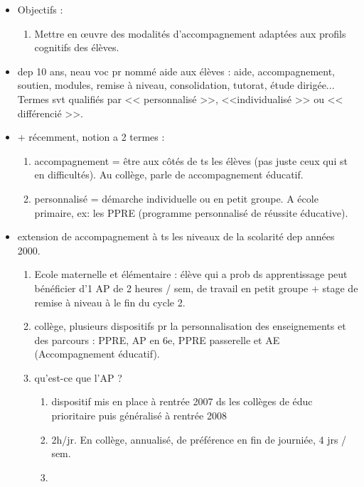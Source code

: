 \documentclass[12pt]{article}
\begin{document}
\begin{itemize}
\item Objectifs : 
\begin{enumerate}
\item Mettre en œuvre des modalités d'accompagnement adaptées aux profils cognitifs des élèves. \\
\end{enumerate}

\item dep 10 ans, neau voc pr nommé aide aux élèves : aide, accompagnement, soutien, modules, remise à niveau, consolidation, tutorat, étude dirigée... Termes svt qualifiés par << personnalisé >>, <<individualisé >> ou << différencié >>.\\
\item + récemment, notion a 2 termes : 
\begin{enumerate}
 \item accompagnement = être aux côtés de ts les élèves (pas juste ceux qui st en difficultés). Au collège, parle de accompagnement éducatif.\\
 \item personnalisé = démarche individuelle ou en petit groupe. A école primaire, ex: les PPRE (programme personnalisé de réussite éducative).\\
\end{enumerate}

\item extension de accompagnement à ts les niveaux de la scolarité dep années 2000.\\
\begin{enumerate}
\item Ecole maternelle et élémentaire :  élève qui a prob ds apprentissage peut bénéficier d'1 AP de 2 heures / sem, de travail en petit groupe + stage de remise à niveau à le fin du cycle 2.\\
\item collège, plusieurs dispositifs pr la personnalisation des enseignements et des parcours : PPRE, AP en 6e, PPRE passerelle et AE (Accompagnement éducatif). \\

\item qu'est-ce que l'AP ? \\

\begin{enumerate}
\item dispositif mis en place à rentrée 2007 ds les collèges de éduc prioritaire puis généralisé à rentrée 2008 \\

\item 2h/jr. En collège, annualisé, de préférence en fin de journiée, 4 jrs / sem. \\

\item 

\end{enumerate}


\end{enumerate}


\end{itemize}
\end{document}
